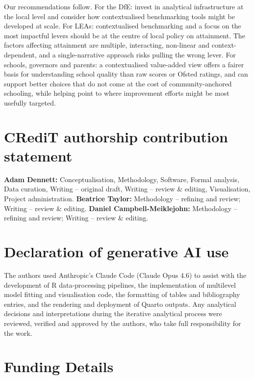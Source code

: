 \documentclass[
  12pt,
  titlepage]{article}
\begin{document}
Our recommendations follow. For the DfE: invest in analytical
infrastructure at the local level and consider how contextualised
benchmarking tools might be developed at scale. For LEAs: contextualised
benchmarking and a focus on the most impactful levers should be at the
centre of local policy on attainment. The factors affecting attainment
are multiple, interacting, non-linear and context-dependent, and a
single-narrative approach risks pulling the wrong lever. For schools,
governors and parents: a contextualised value-added view offers a fairer
basis for understanding school quality than raw scores or Ofsted
ratings, and can support better choices that do not come at the cost of
community-anchored schooling, while helping point to where improvement
efforts might be most usefully targeted.

\section*{CRediT authorship contribution
statement}\label{credit-authorship-contribution-statement}

\textbf{Adam Dennett:} Conceptualisation, Methodology, Software, Formal
analysis, Data curation, Writing -- original draft, Writing -- review \&
editing, Visualisation, Project administration. \textbf{Beatrice
Taylor:} Methodology -- refining and review; Writing -- review \&
editing. \textbf{Daniel Campbell-Meiklejohn:} Methodology -- refining
and review; Writing -- review \& editing.

\section*{Declaration of generative AI
use}\label{declaration-of-generative-ai-use}

The authors used Anthropic's Claude Code (Claude Opus 4.6) to assist
with the development of R data-processing pipelines, the implementation
of multilevel model fitting and visualisation code, the formatting of
tables and bibliography entries, and the rendering and deployment of
Quarto outputs. Any analytical decisions and interpretations during the
iterative analytical process were reviewed, verified and approved by the
authors, who take full responsibility for the work.

\section*{Funding Details}\label{funding-details}
\end{document}
